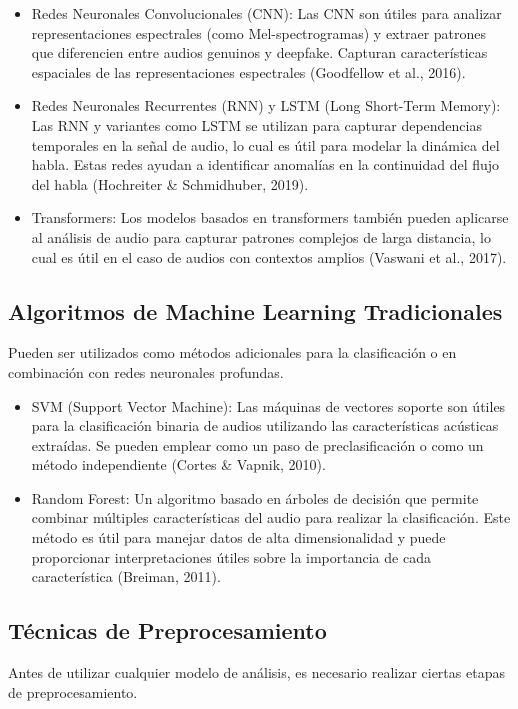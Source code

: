 \begin{itemize}
	\item Redes Neuronales Convolucionales (CNN): Las CNN son útiles para analizar representaciones espectrales (como Mel-spectrogramas) y extraer patrones que diferencien entre audios genuinos y deepfake. Capturan características espaciales de las representaciones espectrales (Goodfellow et al., 2016).
	\item Redes Neuronales Recurrentes (RNN) y LSTM (Long Short-Term Memory): Las RNN y variantes como LSTM se utilizan para capturar dependencias temporales en la señal de audio, lo cual es útil para modelar la dinámica del habla. Estas redes ayudan a identificar anomalías en la continuidad del flujo del habla (Hochreiter \& Schmidhuber, 2019).
	\item Transformers: Los modelos basados en transformers también pueden aplicarse al análisis de audio para capturar patrones complejos de larga distancia, lo cual es útil en el caso de audios con contextos amplios (Vaswani et al., 2017).
\end{itemize}


\subsection{Algoritmos de Machine Learning Tradicionales}
Pueden ser utilizados como métodos adicionales para la clasificación o en combinación con redes neuronales profundas.

\begin{itemize}
	\item SVM (Support Vector Machine): Las máquinas de vectores soporte son útiles para la clasificación binaria de audios utilizando las características acústicas extraídas. Se pueden emplear como un paso de preclasificación o como un método independiente (Cortes \& Vapnik, 2010).
	\item Random Forest: Un algoritmo basado en árboles de decisión que permite combinar múltiples características del audio para realizar la clasificación. Este método es útil para manejar datos de alta dimensionalidad y puede proporcionar interpretaciones útiles sobre la importancia de cada característica (Breiman, 2011).
\end{itemize}




\subsection{Técnicas de Preprocesamiento}
Antes de utilizar cualquier modelo de análisis, es necesario realizar ciertas etapas de preprocesamiento.

